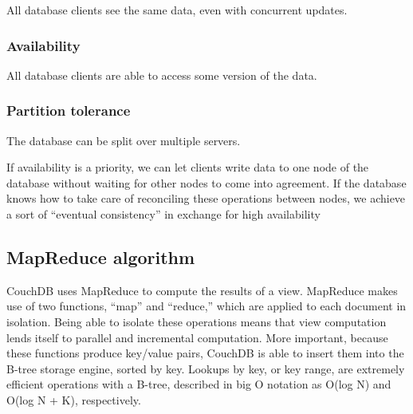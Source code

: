 All database clients see the same data, even with concurrent updates.

\subsubsection{Availability}

All database clients are able to access some version of the data.

\subsubsection{Partition tolerance}

The database can be split over multiple servers.


If availability is a priority, we can let clients write data to one node of the database without waiting for other nodes to come into agreement. If the database knows how to take care of reconciling these operations between nodes, we achieve a sort of “eventual consistency” in exchange for high availability

\subsection{MapReduce algorithm}

CouchDB uses MapReduce to compute the results of a view. MapReduce makes use of two functions, “map” and “reduce,” which are applied to each document in isolation. Being able to isolate these operations means that view computation lends itself to parallel and incremental computation. More important, because these functions produce key/value pairs, CouchDB is able to insert them into the B-tree storage engine, sorted by key. Lookups by key, or key range, are extremely efficient operations with a B-tree, described in big O notation as O(log N) and O(log N + K), respectively.



